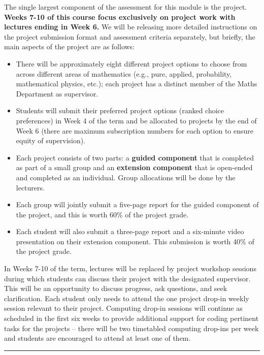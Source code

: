 \documentclass[
  letterpaper,
  DIV=11,
  numbers=noendperiod]{scrreprt}
\providecommand{\tightlist}{%
  \setlength{\itemsep}{0pt}\setlength{\parskip}{0pt}}
\begin{document}
The single largest component of the assessment for this module is the
project. \textbf{Weeks 7-10 of this course focus exclusively on project
work with lectures ending in Week 6.} We will be releasing more detailed
instructions on the project submission format and assessment criteria
separately, but briefly, the main aspects of the project are as follows:

\begin{itemize}
\tightlist
\item
  There will be approximately eight different project options to choose
  from across different areas of mathematics (e.g., pure, applied,
  probability, mathematical physics, etc.); each project has a distinct
  member of the Maths Department as supervisor.
\item
  Students will submit their preferred project options (ranked choice
  preferences) in Week 4 of the term and be allocated to projects by the
  end of Week 6 (there are maximum subscription numbers for each option
  to ensure equity of supervision).
\item
  Each project consists of two parts: a \textbf{guided component} that
  is completed as part of a small group and an \textbf{extension
  component} that is open-ended and completed as an individual. Group
  allocations will be done by the lecturers.
\item
  Each group will jointly submit a five-page report for the guided
  component of the project, and this is worth 60\% of the project grade.
\item
  Each student will also submit a three-page report and a six-minute
  video presentation on their extension component. This submission is
  worth 40\% of the project grade.
\end{itemize}

In Weeks 7-10 of the term, lectures will be replaced by project workshop
sessions during which students can discuss their project with the
designated supervisor. This will be an opportunity to discuss progress,
ask questions, and seek clarification. Each student only needs to attend
the one project drop-in weekly session relevant to their project.
Computing drop-in sessions will continue as scheduled in the first six
weeks to provide additional support for coding pertinent tasks for the
projects -- there will be two timetabled computing drop-ins per week and
students are encouraged to attend at least one of them.

\begin{center}\rule{0.5\linewidth}{0.5pt}\end{center}
\end{document}
